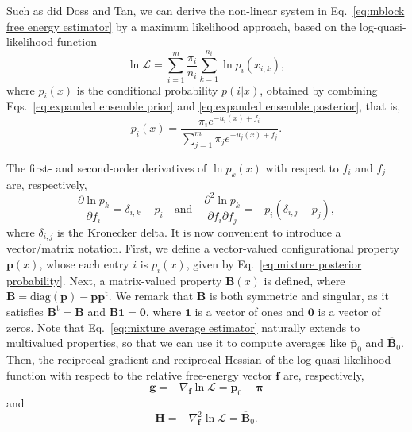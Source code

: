 \documentclass[aip,jcp,reprint,amsmath,amssymb]{revtex4-1}
\newcommand{\mt}[1]{\boldsymbol{\mathbf{#1}}}           %
\newcommand{\vt}[1]{\boldsymbol{\mathbf{#1}}}           %
\newcommand{\tr}[1]{#1^\text{t}}                        %
\begin{document}
Such as did Doss and Tan,\cite{Doss_2014} we can derive the non-linear system in Eq.~\eqref{eq:mblock free energy estimator} by a maximum likelihood approach, based on the log-quasi-likelihood function\cite{Doss_2014, Tan_2015, Roy_2018}
\begin{equation}
\label{eq:mblock log-quasi-likelihood}
\ln \mathcal L = \sum_{i=1}^m \frac{\pi_i}{n_i} \sum_{k=1}^{n_i} \ln p_i(x_{i,k}),
\end{equation}
where $p_i(x)$ is the conditional probability $p(i|x)$, obtained by combining Eqs.~\eqref{eq:expanded ensemble prior} and \eqref{eq:expanded ensemble posterior}, that is,
\begin{equation}
\label{eq:mixture posterior probability}
p_i(x) = \frac{\pi_i e^{-u_i(x) + f_i}}{\sum_{j=1}^m \pi_j e^{-u_j(x) + f_j}}.
\end{equation}

The first- and second-order derivatives of $\ln p_k(x)$ with respect to $f_i$ and $f_j$ are, respectively,
\begin{equation*}
\frac{\partial \ln p_k}{\partial f_i} = \delta_{i,k} - p_i \quad \text{and} \quad \frac{\partial^2\ln p_k}{\partial f_i \partial f_j} = -p_i(\delta_{i,j} - p_j),
\end{equation*}
where $\delta_{i,j}$ is the Kronecker delta. It is now convenient to introduce a vector/matrix notation. First, we define a vector-valued configurational property $\vt p(x)$, whose each entry $i$ is $p_i(x)$, given by Eq.~\eqref{eq:mixture posterior probability}. Next, a matrix-valued property $\mt B(x)$ is defined, where $\mt B = \text{diag}(\vt p) - {\vt p}\tr{\vt p}$. We remark that $\mt B$ is both symmetric and singular, as it satisfies $\tr{\mt B} = \mt B$ and $\mt B\vt 1 = \vt 0$, where $\vt 1$ is a vector of ones and $\vt 0$ is a vector of zeros. Note that Eq.~\eqref{eq:mixture average estimator} naturally extends to multivalued properties, so that we can use it to compute averages like $\overline{\vt p}_0$ and $\overline{\mt B}_0$. Then, the reciprocal gradient and reciprocal Hessian of the log-quasi-likelihood function with respect to the relative free-energy vector $\vt f$ are, respectively,
\begin{equation}
\label{eq:mblock score vector}
\vt g = -\nabla_{\vt f} \ln \mathcal L = \overline{\vt p}_0 - \vt \pi
\end{equation}
and
\begin{equation}
\label{eq:mblock fisher information matrix}
\mt H = -\nabla^2_{\vt f} \ln \mathcal L = \overline{\mt B}_0.
\end{equation}
\end{document}
